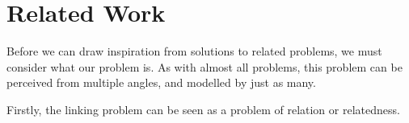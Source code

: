 \section{Related Work}\label{sec:related_work}

Before we can draw inspiration from solutions to related problems, we must consider what our problem is. As with almost all problems, this problem can be perceived from multiple angles, and modelled by just as many.

Firstly, the linking problem can be seen as a problem of relation or relatedness.









